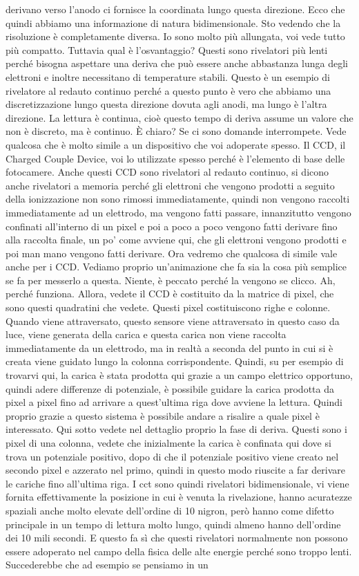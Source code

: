 {derivano verso l'anodo ci fornisce la coordinata lungo questa direzione. Ecco che quindi abbiamo una informazione di natura bidimensionale. Sto vedendo che la risoluzione è completamente diversa. Io sono molto più allungata, voi vede tutto più compatto. Tuttavia qual è l'osvantaggio? Questi sono rivelatori più lenti perché bisogna aspettare una deriva che può essere anche abbastanza lunga degli elettroni e inoltre necessitano di temperature stabili. Questo è un esempio di rivelatore al redauto continuo perché a questo punto è vero che abbiamo una discretizzazione lungo questa direzione dovuta agli anodi, ma lungo è l'altra direzione. La lettura è continua, cioè questo tempo di deriva assume un valore che non è discreto, ma è continuo. È chiaro? Se ci sono domande interrompete. Vede qualcosa che è molto simile a un dispositivo che voi adoperate spesso. Il CCD, il Charged Couple Device, voi lo utilizzate spesso perché è l'elemento di base delle fotocamere. Anche questi CCD sono rivelatori al redauto continuo, si dicono anche rivelatori a memoria perché gli elettroni che vengono prodotti a seguito della ionizzazione non sono rimossi immediatamente, quindi non vengono raccolti immediatamente ad un elettrodo, ma vengono fatti passare, innanzitutto vengono confinati all'interno di un pixel e poi a poco a poco vengono fatti derivare fino alla raccolta finale, un po' come avviene qui, che gli elettroni vengono prodotti e poi man mano vengono fatti derivare. Ora vedremo che qualcosa di simile vale anche per i CCD. Vediamo proprio un'animazione che fa sia la cosa più semplice se fa per messerlo a questa. Niente, è peccato perché la vengono se clicco. Ah, perché funziona. Allora, vedete il CCD è costituito da la matrice di pixel, che sono questi quadratini che vedete. Questi pixel costituiscono righe e colonne. Quando viene attraversato, questo sensore viene attraversato in questo caso da luce, viene generata della carica e questa carica non viene raccolta immediatamente da un elettrodo, ma in realtà a seconda del punto in cui si è creata viene guidato lungo la colonna corrispondente. Quindi, su per esempio di trovarvi qui, la carica è stata prodotta qui grazie a un campo elettrico opportuno, quindi adere differenze di potenziale, è possibile guidare la carica prodotta da pixel a pixel fino ad arrivare a quest'ultima riga dove avviene la lettura. Quindi proprio grazie a questo sistema è possibile andare a risalire a quale pixel è interessato. Qui sotto vedete nel dettaglio proprio la fase di deriva. Questi sono i pixel di una colonna, vedete che inizialmente la carica è confinata qui dove si trova un potenziale positivo, dopo di che il potenziale positivo viene creato nel secondo pixel e azzerato nel primo, quindi in questo modo riuscite a far derivare le cariche fino all'ultima riga. I cct sono quindi rivelatori bidimensionale, vi viene fornita effettivamente la posizione in cui è venuta la rivelazione, hanno acuratezze spaziali anche molto elevate dell'ordine di 10 nigron, però hanno come difetto principale in un tempo di lettura molto lungo, quindi almeno hanno dell'ordine dei 10 mili secondi. E questo fa sì che questi rivelatori normalmente non possono essere adoperato nel campo della fisica delle alte energie perché sono troppo lenti. Succederebbe che ad esempio se pensiamo in un }
